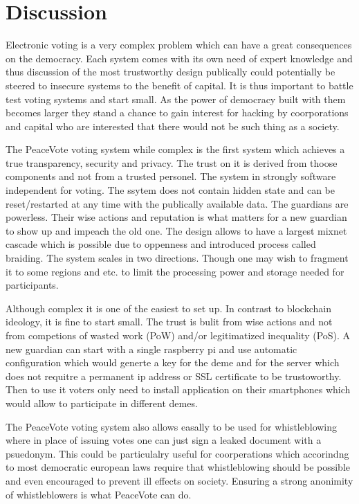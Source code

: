 \documentclass{article}
\begin{document}
\section{Discussion}

Electronic voting is a very complex problem which can have a great consequences on the democracy. Each system comes with its own need of expert knowledge and thus discussion of the most trustworthy design publically could potentially be steered to insecure systems to the benefit of capital. It is thus important to battle test voting systems and start small. As the power of democracy built with them becomes larger they stand a chance to gain interest for hacking by coorporations and capital who are interested that there would not be such thing as a society.

The PeaceVote voting system while complex is the first system which achieves a true transparency, security and privacy. The trust on it is derived from thoose components and not from a trusted personel. The system in strongly software independent for voting. The ssytem does not contain hidden state and can be reset/restarted at any time with the publically available data. The guardians are powerless. Their wise actions and reputation is what matters for a new guardian to show up and impeach the old one. The design allows to have a largest mixnet cascade which is possible due to oppenness and introduced process called braiding. The system scales in two directions. Though one may wish to fragment it to some regions and etc. to limit the processing power and storage needed for participants.

Although complex it is one of the easiest to set up. In contrast to blockchain ideology, it is fine to start small. The trust is bulit from wise actions and not from competions of wasted work (PoW) and/or legitimatized inequality (PoS). A new guardian can start with a single raspberry pi and use automatic configuration which would generte a key for the deme and for the server which does not requitre a permanent ip address or SSL certificate to be trustoworthy. Then to use it voters only need to install application on their smartphones which would allow to participate in different demes. 

The PeaceVote voting system also allows easally to be used for whistleblowing where in place of issuing votes one can just sign a leaked document with a psuedonym. This could be particulalry useful for coorperations which accorindng to most democratic european laws require that whistleblowing should be possible and even encouraged to prevent ill effects on society. Ensuring a strong anonimity of whistleblowers is what PeaceVote can do. 
\end{document}

